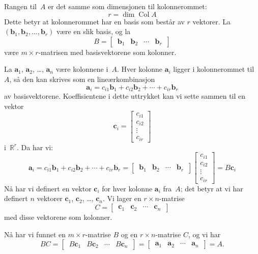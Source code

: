 \documentclass[notitlepage,a4paper,12pt,norsk]{IMFeksamen}
\newcommand{\R}{\mathbb{R}}
\DeclareMathOperator{\Col}{Col}
\newcommand{\V}[1]{\mathbf{#1}}
\newcommand{\vvvv}[4]{\begin{bmatrix} #1 \\ #2 \\ #3 \\ #4 \end{bmatrix}}
\renewcommand{\a}{\V{a}}
\renewcommand{\b}{\V{b}}
\renewcommand{\c}{\V{c}}
\newcommand{\0}{\V{0}}
\newcommand{\oppgslutt}{
\begin{center}
\pgfornament[width=6cm]{88}
\end{center}
}
\newenvironment{losning}{\begin{oppgave}}{\oppgslutt\end{oppgave}}
\begin{document}
\begin{losning}
Rangen til~$A$ er det samme som dimensjonen til kolonnerommet:
\[
r = \dim \Col A
\]
Dette betyr at kolonnerommet har en basis som består av $r$ vektorer.
La $(\b_1, \b_2, \ldots, \b_r)$ være en slik basis,
og la
\[
B =
\begin{bmatrix}
\,
\b_1 & \b_2 & \cdots & \b_r
\,
\end{bmatrix}
\]
være $m \times r$-matrisen med basisvektorene som kolonner.

La $\a_1$, $\a_2$, \ldots, $\a_n$ være kolonnene i~$A$.
Hver kolonne $\a_i$ ligger i kolonnerommet til~$A$,
så den kan skrives som en lineærkombinasjon
\[
\a_i = c_{i1} \b_1 + c_{i2} \b_2 + \cdots + c_{ir} \b_r
\]
av basisvektorene.
Koeffisientene i dette uttrykket kan vi sette sammen til en vektor
\[
\c_i = \vvvv{c_{i1}}{c_{i2}}{\vdots}{c_{ir}}
\]
i~$\R^r$.
Da har vi:
\[
\a_i
= c_{i1} \b_1 + c_{i2} \b_2 + \cdots + c_{ir} \b_r
=
\begin{bmatrix}
\,
\b_1 & \b_2 & \cdots & \b_r
\,
\end{bmatrix}
\vvvv{c_{i1}}{c_{i2}}{\vdots}{c_{ir}}
= B \c_i
\]
Nå har vi definert en vektor $\c_i$ for hver kolonne $\a_i$ fra~$A$;
det betyr at vi har definert $n$ vektorer
$\c_1$, $\c_2$, \ldots, $\c_n$.  Vi lager en $r \times n$-matrise
\[
C =
\begin{bmatrix}
\,
\c_1 & \c_2 & \cdots & \c_n
\,
\end{bmatrix}
\]
med disse vektorene som kolonner.

Nå har vi funnet en $m \times r$-matrise $B$
og en $r \times n$-matrise $C$, og vi har
\[
BC =
\begin{bmatrix}
\,
B \c_1 & B \c_2 & \cdots & B \c_n
\,
\end{bmatrix}
=
\begin{bmatrix}
\,
\a_1 & \a_2 & \cdots & \a_n
\,
\end{bmatrix}
= A.
\]
\end{losning}
\end{document}
